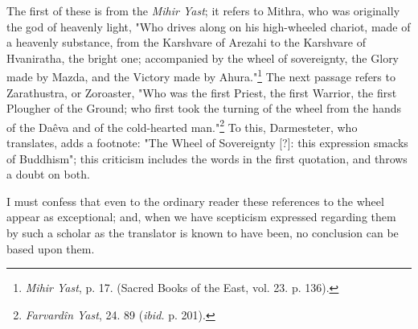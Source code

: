 \documentclass[a4paper, 11pt, oneside, polutonikogreek, english]{article}
\begin{document}
The first of these is from the \emph{Mihir Yast}; it refers to Mithra, who was originally the god of heavenly light, "Who drives along on his high-wheeled chariot, made of a heavenly substance, from the Karshvare of Arezahi to the Karshvare of Hvaniratha, the bright one; accompanied by the wheel of sovereignty, the Glory made by Mazda, and the Victory made by Ahura."\footnote{\emph{Mihir Yast}, p. 17. (Sacred Books of the East, vol. 23. p. 136).} The next passage refers to Zarathustra, or Zoroaster, "Who was the first Priest, the first Warrior, the first Plougher of the Ground; who first took the turning of the wheel from the hands of the Daêva and of the cold-hearted man."\footnote{\emph{Farvardîn Yast}, 24. 89 (\emph{ibid.} p. 201).} To this, Darmesteter, who translates, adds a footnote: "The Wheel of Sovereignty [?]: this expression smacks of Buddhism"; this criticism includes the words in the first quotation, and throws a doubt on both.

I must confess that even to the ordinary reader these references to the wheel appear as exceptional; and, when we have scepticism expressed regarding them by such a scholar as the translator is known to have been, no conclusion can be based upon them.
\end{document}
